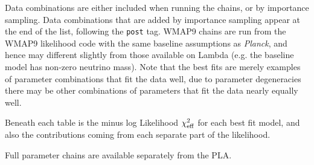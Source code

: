 Data combinations are either included when running the chains, or by importance sampling. Data combinations that are added by importance sampling appear
at the end of the list, following the {\tt post{\textunderscore}} tag. WMAP9 chains are run from the WMAP9 likelihood code with the same baseline assumptions as \textit{Planck}, and hence
may different slightly from those available on Lambda (e.g. the baseline model has non-zero neutrino mass). Note that the best fits are merely examples of parameter combinations that fit the data well, due to parameter degeneracies there may be other combinations of parameters that fit the data nearly equally well.

Beneath each table is the minus log Likelihood $\chi^2_{\rm eff}$ for each best fit model, and also the contributions coming from each separate part of the likelihood.

Full parameter chains are available separately from the PLA.

\newpage
